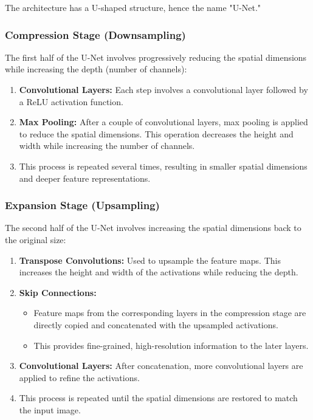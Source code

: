 \documentclass[letterpaper,12pt,notitlepage,twoside]{report}
\begin{document}
The architecture has a U-shaped structure, hence the name "U-Net."

\subsubsection*{Compression Stage (Downsampling)}

The first half of the U-Net involves progressively reducing the spatial dimensions while increasing the depth (number of channels):
\begin{enumerate}
    \item \textbf{Convolutional Layers:} Each step involves a convolutional layer followed by a ReLU activation function.
    \item \textbf{Max Pooling:} After a couple of convolutional layers, max pooling is applied to reduce the spatial dimensions. This operation decreases the height and width while increasing the number of channels.
    \item This process is repeated several times, resulting in smaller spatial dimensions and deeper feature representations.
\end{enumerate}

\subsubsection*{Expansion Stage (Upsampling)}

The second half of the U-Net involves increasing the spatial dimensions back to the original size:
\begin{enumerate}
    \item \textbf{Transpose Convolutions:} Used to upsample the feature maps. This increases the height and width of the activations while reducing the depth.
    \item \textbf{Skip Connections:} 
    \begin{itemize}
        \item Feature maps from the corresponding layers in the compression stage are directly copied and concatenated with the upsampled activations.
        \item This provides fine-grained, high-resolution information to the later layers.
    \end{itemize}
    \item \textbf{Convolutional Layers:} After concatenation, more convolutional layers are applied to refine the activations.
    \item This process is repeated until the spatial dimensions are restored to match the input image.
\end{enumerate}
\end{document}
